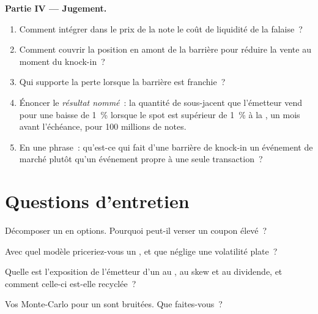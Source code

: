\begin{problem}
\medskip\noindent\textbf{Partie IV --- Jugement.}
\begin{enumerate}[resume]
\item Comment intégrer dans le prix de la note le coût de liquidité de la falaise~?
\item Comment couvrir la position en amont de la barrière pour réduire la vente au moment du knock-in~?
\item Qui supporte la perte lorsque la barrière est franchie~?
\item Énoncer le \emph{résultat nommé}~: la quantité de sous-jacent que l'émetteur vend pour une baisse de 1~\% lorsque le spot est supérieur de 1~\% à la , un mois avant l'échéance, pour 100 millions de notes.
\item En une phrase~: qu'est-ce qui fait d'une barrière de knock-in un événement de marché plutôt qu'un événement propre à une seule transaction~?
\end{enumerate}
\end{problem}

\section{Questions d'entretien}

\begin{interviewq}\label{iq:dv:autocallables:1}
Décomposer un  en options. Pourquoi peut-il verser un coupon élevé~?
\end{interviewq}

\begin{interviewq}\label{iq:dv:autocallables:2}
Avec quel modèle priceriez-vous un , et que néglige une volatilité plate~?
\end{interviewq}

\begin{interviewq}\label{iq:dv:autocallables:3}
Quelle est l'exposition de l'émetteur d'un  au , au skew et au dividende, et comment celle-ci est-elle recyclée~?
\end{interviewq}

\begin{interviewq}\label{iq:dv:autocallables:4}
Vos  Monte-Carlo pour un  sont bruitées. Que faites-vous~?
\end{interviewq}

